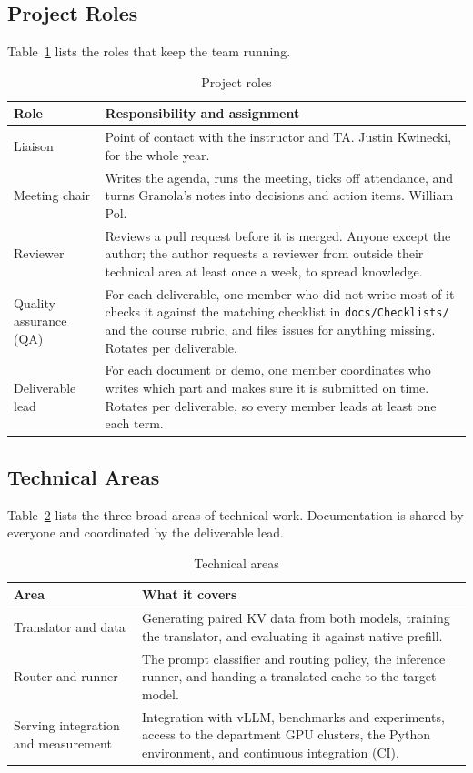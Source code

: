 \documentclass{article}
\begin{document}
\subsection{Project Roles}

Table~\ref{TblProjectRoles} lists the roles that keep the team running.

\begin{table}[H]
\caption{Project roles} \label{TblProjectRoles}
\begin{tabularx}{\textwidth}{lX}
\toprule
\textbf{Role} & \textbf{Responsibility and assignment}\\
\midrule
Liaison & Point of contact with the instructor and TA. Justin Kwinecki,
for the whole year.\\
Meeting chair & Writes the agenda, runs the meeting, ticks off attendance,
and turns Granola's notes into decisions and action items. William Pol.\\
Reviewer & Reviews a pull request before it is merged. Anyone except the
author; the author requests a reviewer from outside their technical area
at least once a week, to spread knowledge.\\
Quality assurance (QA) & For each deliverable, one member who did not
write most of it checks it against the matching checklist in
\texttt{docs/Checklists/} and the course rubric, and files issues for
anything missing. Rotates per deliverable.\\
Deliverable lead & For each document or demo, one member coordinates who
writes which part and makes sure it is submitted on time. Rotates per
deliverable, so every member leads at least one each term.\\
\bottomrule
\end{tabularx}
\end{table}

\subsection{Technical Areas}

Table~\ref{TblAreas} lists the three broad areas of technical work.
Documentation is shared by everyone and coordinated by the deliverable
lead.

\begin{table}[H]
\caption{Technical areas} \label{TblAreas}
\begin{tabularx}{\textwidth}{lX}
\toprule
\textbf{Area} & \textbf{What it covers}\\
\midrule
Translator and data & Generating paired KV data from both models,
training the translator, and evaluating it against native prefill.\\
Router and runner & The prompt classifier and routing policy, the
inference runner, and handing a translated cache to the target model.\\
Serving integration and measurement & Integration with vLLM, benchmarks
and experiments, access to the department GPU clusters, the Python
environment, and continuous integration (CI).\\
\bottomrule
\end{tabularx}
\end{table}
\end{document}
